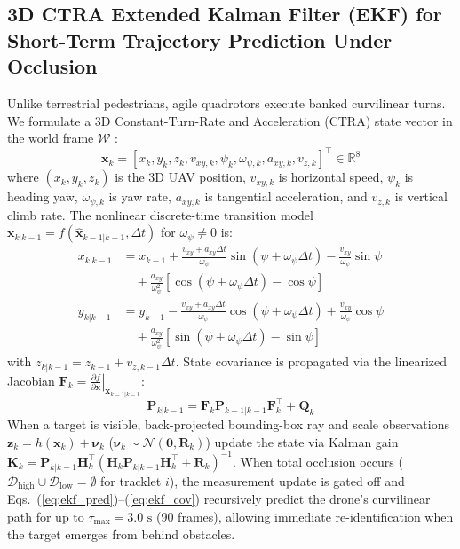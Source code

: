 \documentclass[conference]{IEEEtran}
\begin{document}
\subsection{3D CTRA Extended Kalman Filter (EKF) for Short-Term Trajectory Prediction Under Occlusion}
Unlike terrestrial pedestrians, agile quadrotors execute banked curvilinear turns. We formulate a 3D Constant-Turn-Rate and Acceleration (CTRA) state vector in the world frame $\mathcal{W}$ \cite{ref13, ref14}:
\begin{equation}
\mathbf{x}_k = [x_k, y_k, z_k, v_{xy,k}, \psi_k, \omega_{\psi,k}, a_{xy,k}, v_{z,k}]^\top \in \mathbb{R}^8
\label{eq:state}
\end{equation}
where $(x_k, y_k, z_k)$ is the 3D UAV position, $v_{xy,k}$ is horizontal speed, $\psi_k$ is heading yaw, $\omega_{\psi,k}$ is yaw rate, $a_{xy,k}$ is tangential acceleration, and $v_{z,k}$ is vertical climb rate. The nonlinear discrete-time transition model $\mathbf{x}_{k|k-1} = f(\hat{\mathbf{x}}_{k-1|k-1}, \Delta t)$ for $\omega_{\psi} \neq 0$ is:
\begin{align}
x_{k|k-1} &= x_{k-1} + \frac{v_{xy} + a_{xy}\Delta t}{\omega_\psi}\sin(\psi + \omega_\psi\Delta t) - \frac{v_{xy}}{\omega_\psi}\sin\psi \nonumber\\
&\quad + \frac{a_{xy}}{\omega_\psi^2}\left[\cos(\psi + \omega_\psi\Delta t) - \cos\psi\right] \label{eq:ekf_pred}\\
y_{k|k-1} &= y_{k-1} - \frac{v_{xy} + a_{xy}\Delta t}{\omega_\psi}\cos(\psi + \omega_\psi\Delta t) + \frac{v_{xy}}{\omega_\psi}\cos\psi \nonumber\\
&\quad + \frac{a_{xy}}{\omega_\psi^2}\left[\sin(\psi + \omega_\psi\Delta t) - \sin\psi\right]
\end{align}
with $z_{k|k-1} = z_{k-1} + v_{z,k-1}\Delta t$. State covariance is propagated via the linearized Jacobian $\mathbf{F}_k = \left.\frac{\partial f}{\partial \mathbf{x}}\right|_{\hat{\mathbf{x}}_{k-1|k-1}}$:
\begin{equation}
\mathbf{P}_{k|k-1} = \mathbf{F}_k \mathbf{P}_{k-1|k-1} \mathbf{F}_k^\top + \mathbf{Q}_k
\label{eq:ekf_cov}
\end{equation}
When a target is visible, back-projected bounding-box ray and scale observations $\mathbf{z}_k = h(\mathbf{x}_k) + \boldsymbol{\nu}_k$ ($\boldsymbol{\nu}_k \sim \mathcal{N}(\mathbf{0}, \mathbf{R}_k)$) update the state via Kalman gain $\mathbf{K}_k = \mathbf{P}_{k|k-1}\mathbf{H}_k^\top(\mathbf{H}_k\mathbf{P}_{k|k-1}\mathbf{H}_k^\top + \mathbf{R}_k)^{-1}$. When total occlusion occurs ($\mathcal{D}_{\text{high}} \cup \mathcal{D}_{\text{low}} = \emptyset$ for tracklet $i$), the measurement update is gated off and Eqs.~(\ref{eq:ekf_pred})--(\ref{eq:ekf_cov}) recursively predict the drone's curvilinear path for up to $\tau_{\text{max}} = 3.0\text{ s}$ ($90$ frames), allowing immediate re-identification when the target emerges from behind obstacles.
\end{document}
